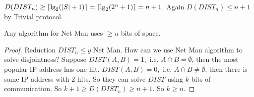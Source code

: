 \begin{corollary}
    $D(DIST_n) \geq \left \lceil \lg_2(\left | S \right | + 1) \right \rceil = \left \lceil \lg_2(2^n + 1) \right \rceil = n + 1$. Again $D(DIST_n) \leq n + 1$ by Trivial protocol.
\end{corollary}

\begin{theorem}
    Any algorithm for Net Man uses $\geq n$ bits of space.
\end{theorem}

\begin{proof}
    Reduction $DIST_n \leq y$ Net Man. How can we use Net Man algorithm to solve disjointness? Suppose $DIST(A, B) = 1, $ i.e. $A \cap B = \emptyset$, then the most popular IP address has one hit. $DIST(A, B) = 0, $ i.e. $A \cap B \neq \emptyset$, then there is some IP address with 2 hits. So they can solve $DIST$ using $k$ bits of communication. So $k + 1 \geq D(DIST_n) \geq n + 1$. So $k \geq n$.
\end{proof}
